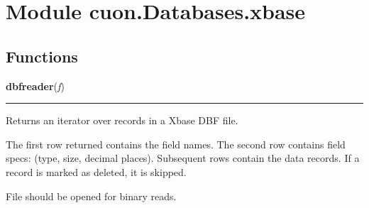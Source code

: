 %
%
%


\section{Module cuon.Databases.xbase}

    \label{cuon:Databases:xbase}


  \subsection{Functions}

    \label{cuon:Databases:xbase:dbfreader}

    \vspace{0.5ex}

\hspace{.8\funcindent}\begin{boxedminipage}{\funcwidth}

    \raggedright \textbf{dbfreader}(\textit{f})

    \vspace{-1.5ex}

    \rule{\textwidth}{0.5\fboxrule}
\setlength{\parskip}{2ex}
    Returns an iterator over records in a Xbase DBF file.

    The first row returned contains the field names. The second row 
    contains field specs: (type, size, decimal places). Subsequent rows 
    contain the data records. If a record is marked as deleted, it is 
    skipped.

    File should be opened for binary reads.

\setlength{\parskip}{1ex}
    \end{boxedminipage}

